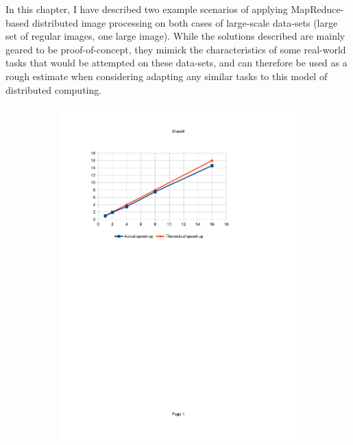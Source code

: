 \documentclass [12pt,a4paper]{report}
\begin{document}
In this chapter, I have described two example scenarios of applying MapReduce-based distributed image processing on both cases of large-scale data-sets (large set of regular images, one large image). While the solutions described are mainly geared to be proof-of-concept, they mimick the characteristics of some real-world tasks that would be attempted on these data-sets, and can therefore be used as a rough estimate when considering adapting any similar tasks to this model of distributed computing.

\begin{figure}[h]
\begin{subfigure}{.5\textwidth}
  \centering
  \includegraphics[scale=1.0]{bf_speedup.pdf} %
\end{subfigure}

\end{figure}
\end{document}

